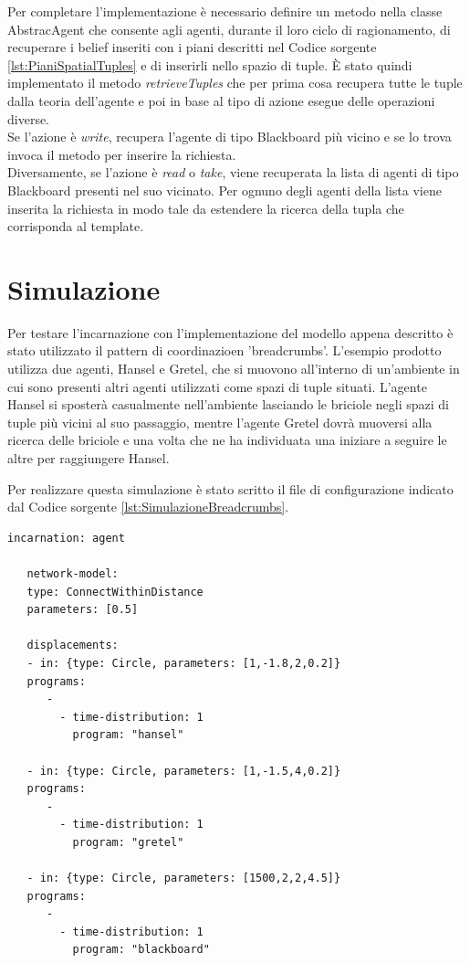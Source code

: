 \documentclass[12pt,a4paper,openright,twoside]{report}
\begin{document}
Per completare l'implementazione \`e necessario definire un metodo nella classe AbstracAgent che consente agli agenti, durante il loro ciclo di ragionamento, di recuperare i belief inseriti con i piani descritti nel Codice sorgente \ref{lst:PianiSpatialTuples} e di inserirli nello spazio di tuple. \`E stato quindi implementato il metodo \textit{retrieveTuples} che per prima cosa recupera tutte le tuple dalla teoria dell'agente e poi in base al tipo di azione esegue delle operazioni diverse.
\\
Se l'azione \`e \textit{write}, recupera l'agente di tipo Blackboard pi\`u vicino e se lo trova invoca il metodo per inserire la richiesta.
\\
Diversamente, se l'azione \`e \textit{read} o \textit{take}, viene recuperata la lista di agenti di tipo Blackboard presenti nel suo vicinato. Per ognuno degli agenti della lista viene inserita la richiesta in modo tale da estendere la ricerca della tupla che corrisponda al template.

\section{Simulazione}
Per testare l'incarnazione con l'implementazione del modello appena descritto \`e stato utilizzato il pattern di coordinazioen 'breadcrumbs'. L'esempio prodotto utilizza due agenti, Hansel e Gretel, che si muovono all'interno di un'ambiente in cui sono presenti altri agenti utilizzati come spazi di tuple situati. L'agente Hansel si sposter\`a casualmente nell'ambiente lasciando le briciole negli spazi di tuple pi\`u vicini al suo passaggio, mentre l'agente Gretel dovr\`a muoversi alla ricerca delle briciole e una volta che ne ha individuata una iniziare a seguire le altre per raggiungere Hansel.

Per realizzare questa simulazione \`e stato scritto il file di configurazione indicato dal Codice sorgente \ref{lst:SimulazioneBreadcrumbs}.
\medskip
\begin{lstlisting}[firstnumber=1,label={lst:SimulazioneBreadcrumbs},caption={Simulazione modello Spatial Tuples con modello di coordinazione breadcrumbs}]
   incarnation: agent

   network-model:
   type: ConnectWithinDistance
   parameters: [0.5]

   displacements:
   - in: {type: Circle, parameters: [1,-1.8,2,0.2]}
   programs:
      -
        - time-distribution: 1
          program: "hansel"

   - in: {type: Circle, parameters: [1,-1.5,4,0.2]}
   programs:
      -
        - time-distribution: 1
          program: "gretel"

   - in: {type: Circle, parameters: [1500,2,2,4.5]}
   programs:
      -
        - time-distribution: 1
          program: "blackboard"
\end{lstlisting}
\end{document}
